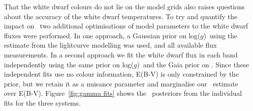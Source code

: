 That the white dwarf colours do not lie on the model grids also raises questions about the accuracy of the white dwarf temperatures. To try and quantify the impact on \teff\, two additional optimisations of model parameters to the white dwarf fluxes were performed.
In one approach, a Gaussian prior on log($g$)\ using the estimate from the lightcurve modelling was used, and all available flux measurements.
In a second approach we fit the white dwarf flux in each band independently using the same prior on log($g$)\ and the Gaia prior on \plax. Since these independent fits use no colour information, E(B-V) is only constrained by the prior, but we retain it as a nuisance parameter and marginalise our \teff\ estimate over E(B-V). Figure~\ref{fig:gamma fits} shows the \teff\ posteriors from the individual fits for the three systems.

